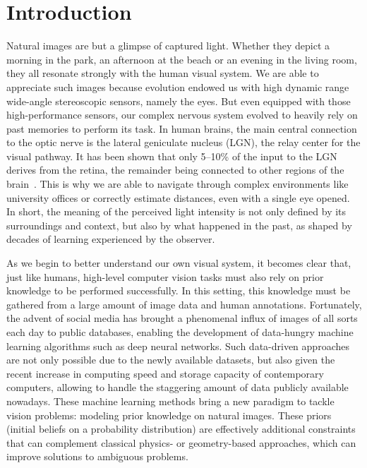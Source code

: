 \chapter*{Introduction}         %

Natural images are but a glimpse of captured light. Whether they depict a morning in the park, an afternoon at the beach or an evening in the living room, they all resonate strongly with the human visual system. We are able to appreciate such images because evolution endowed us with high dynamic range wide-angle stereoscopic sensors, namely the eyes. But even equipped with those high-performance sensors, our complex nervous system evolved to heavily rely on past memories to perform its task. In human brains, the main central connection to the optic nerve is the lateral geniculate nucleus (LGN), the relay center for the visual pathway. It has been shown that only 5--10\% of the input to the LGN derives from the retina, the remainder being connected to other regions of the brain~\cite{van2000relative}. This is why we are able to navigate through complex environments like university offices or correctly estimate distances, even with a single eye opened. In short, the meaning of the perceived light intensity is not only defined by its surroundings and context, but also by what happened in the past, as shaped by decades of learning experienced by the observer. 

As we begin to better understand our own visual system, it becomes clear that, just like humans, high-level computer vision tasks must also rely on prior knowledge to be performed successfully. In this setting, this knowledge must be gathered from a large amount of image data and human annotations. Fortunately, the advent of social media has brought a phenomenal influx of images of all sorts each day to public databases, enabling the development of data-hungry machine learning algorithms such as deep neural networks. Such data-driven approaches are not only possible due to the newly available datasets, but also given the recent increase in computing speed and storage capacity of contemporary computers, allowing to handle the staggering amount of data publicly available nowadays. These machine learning methods bring a new paradigm to tackle vision problems: modeling prior knowledge on natural images. These priors (initial beliefs on a probability distribution) are effectively additional constraints that can complement classical physics- or geometry-based approaches, which can improve solutions to ambiguous problems. 

